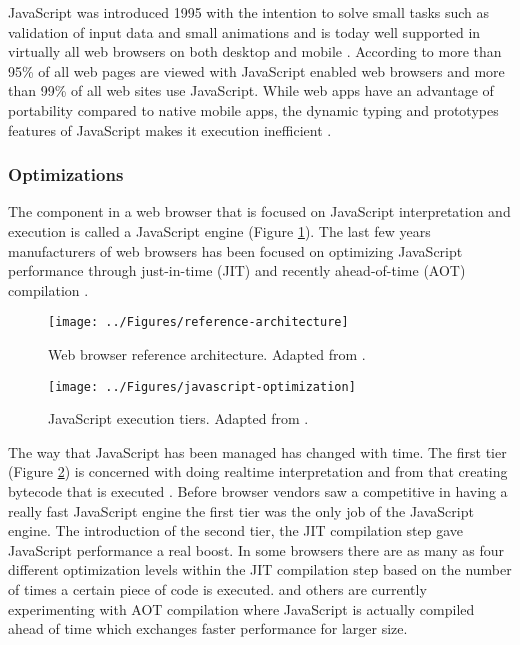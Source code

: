 JavaScript was introduced 1995 with the intention to solve small tasks such as validation of input data and small animations \parencite{Moller2018} and is today well supported in virtually all web browsers on both desktop and mobile \parencite{Zakai2011}. According to \textcite{TiwariSolihin2012} more than 95\% of all web pages are viewed with JavaScript enabled web browsers and more than 99\% of all web sites use JavaScript. While web apps have an advantage of portability compared to native mobile apps, the dynamic typing and prototypes features of JavaScript makes it execution inefficient \parencite{ParkJungMoon2015}.

\subsubsection*{Optimizations}

The component in a web browser that is focused on JavaScript interpretation and execution is called a JavaScript engine (Figure \ref{reference-architecture}). The last few years manufacturers of web browsers has been focused on optimizing JavaScript performance through just-in-time (JIT) and recently ahead-of-time (AOT) compilation \parencite{HerreraChenLavoieHendren2018}.

\begin{figure}[!h]
\centering
\texttt{[image: ../Figures/reference-architecture]}
\caption{Web browser reference architecture. Adapted from \textcite{GrosskurthGodfrey2005}.}
\label{reference-architecture}
\end{figure}
    
\begin{figure}[!h]
\centering
\texttt{[image: ../Figures/javascript-optimization]}
\caption{JavaScript execution tiers. Adapted from \textcite{ParkKimMoon2017,ZhuykovVardanyanMelnikBuchatskiySharygin2015}.}
\label{javascript-optimization}
\end{figure}
    


The way that JavaScript has been managed has changed with time. The first tier (Figure \ref{javascript-optimization}) is concerned with doing realtime interpretation and from that creating bytecode that is executed \parencite{ParkKimMoon2017}. Before browser vendors saw a competitive in having a really fast JavaScript engine the first tier was the only job of the JavaScript engine. The introduction of the second tier, the JIT compilation step gave JavaScript performance a real boost. In some browsers there are as many as four different optimization levels within the JIT compilation step based on the number of times a certain piece of code is executed. \textcite{ZhuykovVardanyanMelnikBuchatskiySharygin2015} and others are currently experimenting with AOT compilation where JavaScript is actually compiled ahead of time which exchanges faster performance for larger size.

